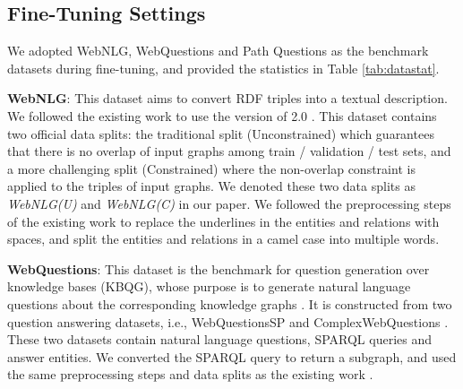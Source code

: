 \documentclass[11pt,a4paper]{article}
\begin{document}
\begin{table*} [!htp]
\centering
\small
{}
\caption{Human evaluation on WebNLG(U). The scores indicate the percentages of win, lose and tie when JointGT is compared with other baselines. $\kappa$ is Fleiss' Kappa (all indicate moderate agreement). The scores marked with * mean $p<0.05$ while ** means $p<0.01$ in sign test.}
\label{tab:webnlghuman}
\end{table*}


\subsection{Fine-Tuning Settings}


We adopted
WebNLG, WebQuestions and Path Questions as the benchmark datasets during fine-tuning, and provided the statistics in Table \ref{tab:datastat}.

\noindent \textbf{WebNLG}: This dataset aims to convert RDF triples into a textual description. We followed the existing work \cite{chen2020kgpt} to use the version of 2.0 \cite{shimorina2018webnlgv2}. This dataset contains two official data splits: the traditional split (Unconstrained) which guarantees that there is no overlap of input graphs among train / validation / test sets,
and a more challenging split (Constrained) where the non-overlap constraint is applied to the triples of input graphs.
We denoted these two data splits as \textit{WebNLG(U)} and \textit{WebNLG(C)} in our paper. 
We followed the preprocessing steps of the existing work \cite{chen2020kgpt} to replace the underlines in the entities and relations with spaces, and split the entities and relations in a camel case into multiple words.


\noindent \textbf{WebQuestions}: This dataset \cite{yih2016webquestion,talmor2018complexwq} is the benchmark for question generation over knowledge bases (KBQG), whose purpose is to generate natural language questions about the corresponding knowledge graphs \cite{serban2016simplequestion}. 
It is constructed from two question answering datasets, i.e., WebQuestionsSP \cite{yih2016webquestion} and ComplexWebQuestions \cite{talmor2018complexwq}. These two datasets contain natural language questions, SPARQL queries and answer entities. We converted the SPARQL query to return a subgraph, and used the same preprocessing steps and data splits as the existing work \cite{kumar2019mhqg,chen2020bignn}.
\end{document}
